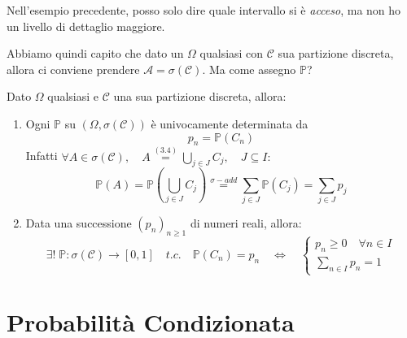 \begin{esempio}
    Nell'esempio precedente, posso solo dire quale intervallo si è \textit{acceso}, ma non ho un livello di dettaglio maggiore.
\end{esempio}
Abbiamo quindi capito che dato un $\Omega$ qualsiasi con $\mathcal{C}$ sua partizione discreta, allora ci conviene prendere $\mathcal{A} = \sigma (\mathcal{C})$. Ma come assegno $\mathbb{P}$?
\begin{teorema}
    Dato $\Omega$ qualsiasi e $\mathcal{C}$ una sua partizione discreta, allora:
    \begin{enumerate}
        \item Ogni $\mathbb{P}$ su $(\Omega, \sigma(\mathcal{C}))$ è univocamente determinata da 
        \[p_n = \mathbb{P}(C_n)\]
        Infatti $\forall A \in \sigma(\mathcal{C}), \quad A \overset{(3.4)}{=} \bigcup_{j\in J}C_j,\quad J\subseteq I:$
        \[\mathbb{P}(A) = \mathbb{P}\left(\bigcup_{j\in J}C_j\right) \overset{\sigma-add}{=} \sum_{j\in J}\mathbb{P}(C_j)  = \sum_{j \in J} p_j\]
        \item Data una successione $(p_n)_{n\geq1}$ di numeri reali, allora:
        \[
        \exists!\;\mathbb{P}:\sigma(\mathcal{C})\rightarrow[0, 1] \quad t.c. \quad \mathbb{P}(C_n) = p_n 
        \quad \iff \quad
        \begin{cases}
            p_n \geq 0 \quad \forall n\in I \\
            \sum_{n \in I} p_n = 1
        \end{cases}
        \]
    \end{enumerate}
\end{teorema}

\section{Probabilità Condizionata}

